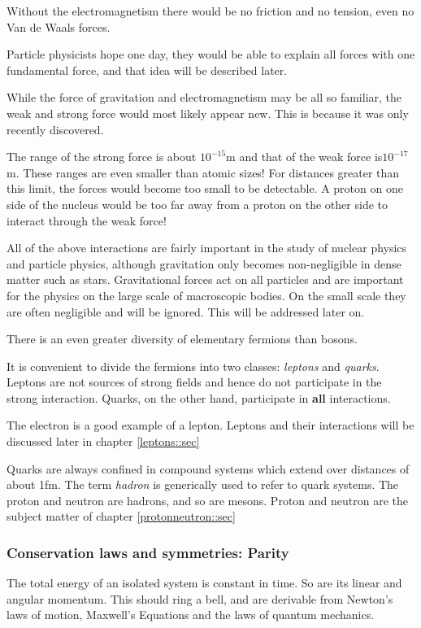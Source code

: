 Without the electromagnetism there would be no friction and no tension, even no Van de Waals forces.

Particle physicists hope one day, they would be able to explain all forces with one fundamental force, and that idea will be described later.

While the force of gravitation and electromagnetism may be all so familiar, the weak and strong force would most likely appear new. This is because it was only recently discovered.

The range of the strong force is about $10^{-15}$m and that of the weak force is$10^{-17}$m. These ranges are even smaller than atomic sizes! For distances greater than this limit, the forces would become too small to be detectable. A proton on one side of the nucleus would be too far away from a proton on the other side to interact through the weak force!

All of the above interactions are fairly important in the study of nuclear physics and particle physics, although gravitation only becomes non-negligible in dense matter such as stars. Gravitational forces act on all particles and are important for the physics on the large scale of macroscopic bodies. On the small scale they are often negligible and will be ignored. This will be addressed later on.

There is an even greater diversity of elementary fermions than bosons.

It is convenient to divide the fermions into two classes: \emph{leptons} and \emph{quarks}. Leptons are not sources of strong fields and hence do not participate in the strong interaction. Quarks, on the other hand, participate in \textbf{all} interactions.

The electron is a good example of a lepton. Leptons and their interactions will be discussed later in chapter \ref{leptons::sec}

Quarks are always confined in compound systems which extend over distances of about 1fm. The term \emph{hadron} is generically used to refer to quark systems. The proton and neutron are hadrons, and so are mesons. Proton and neutron are the subject matter of chapter \ref{protonneutron::sec}

\subsubsection{Conservation laws and symmetries: Parity}
The total energy of an isolated system is constant in time. So are its linear and angular momentum. This should ring a bell, and are derivable from Newton's laws of motion, Maxwell's Equations and the laws of quantum mechanics.

